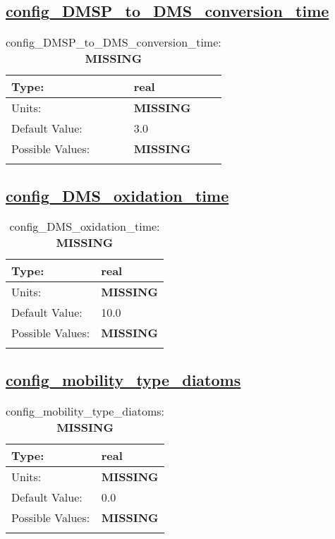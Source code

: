 \subsection[config\_DMSP\_to\_DMS\_conversion\_time]{\hyperref[sec:nm_tab_biogeochemistry]{config\_DMSP\_to\_DMS\_conversion\_time}}
\label{subsec:nm_sec_config_DMSP_to_DMS_conversion_time}
\begin{center}
\begin{longtable}{| p{2.0in} || p{4.0in} |}
    \hline
    Type: & real \\
    \hline
    Units: & {\bf \color{red} MISSING} \\
    \hline
    Default Value: & 3.0 \\
    \hline
    Possible Values: & {\bf \color{red} MISSING} \\
    \hline
    \caption{config\_DMSP\_to\_DMS\_conversion\_time: {\bf \color{red} MISSING}}
\end{longtable}
\end{center}
\subsection[config\_DMS\_oxidation\_time]{\hyperref[sec:nm_tab_biogeochemistry]{config\_DMS\_oxidation\_time}}
\label{subsec:nm_sec_config_DMS_oxidation_time}
\begin{center}
\begin{longtable}{| p{2.0in} || p{4.0in} |}
    \hline
    Type: & real \\
    \hline
    Units: & {\bf \color{red} MISSING} \\
    \hline
    Default Value: & 10.0 \\
    \hline
    Possible Values: & {\bf \color{red} MISSING} \\
    \hline
    \caption{config\_DMS\_oxidation\_time: {\bf \color{red} MISSING}}
\end{longtable}
\end{center}
\subsection[config\_mobility\_type\_diatoms]{\hyperref[sec:nm_tab_biogeochemistry]{config\_mobility\_type\_diatoms}}
\label{subsec:nm_sec_config_mobility_type_diatoms}
\begin{center}
\begin{longtable}{| p{2.0in} || p{4.0in} |}
    \hline
    Type: & real \\
    \hline
    Units: & {\bf \color{red} MISSING} \\
    \hline
    Default Value: & 0.0 \\
    \hline
    Possible Values: & {\bf \color{red} MISSING} \\
    \hline
    \caption{config\_mobility\_type\_diatoms: {\bf \color{red} MISSING}}
\end{longtable}
\end{center}
